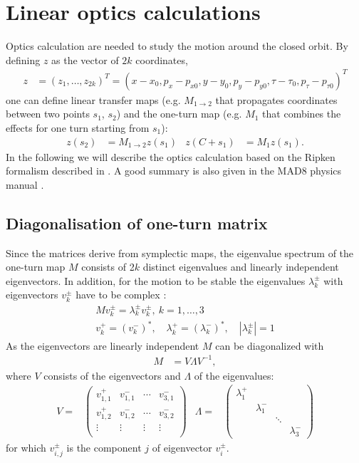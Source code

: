 \chapter{Linear optics calculations}
\label{opt}
Optics calculation are needed to study the motion around the closed orbit. By defining $z$ as the vector of $2 k$ coordinates,  
\begin{align}\label{opt:eqn:1}
z&=(z_1,\ldots,z_{2k})^T=(x-x_0,p_x-p_{x0},y-y_0,p_y-p_{y0},\tau-\tau_0,p_\tau-p_{\tau0})^T
\end{align}
one can define linear transfer maps (e.g. $M_{1\to 2}$ that propagates coordinates between two points $s_1$, $s_2$) and the one-turn map (e.g. $M_1$ that combines the effects for one turn starting from $s_1$):
\begin{align}\label{opt:eqn:2}
z(s_2)&= M_{1\to 2} z(s_1) & z(C+s_1) &= M_1 z(s_1).
\end{align}
In the following we will describe the optics calculation based on the Ripken formalism described in \cite{willeke88}. A good summary is also given in the MAD8 physics manual \cite{mad8phys}.

\section{Diagonalisation of one-turn matrix}
\label{opt:sec:1}
Since the matrices derive from symplectic maps, the eigenvalue spectrum of the one-turn map $M$ consists of 2$k$ distinct eigenvalues and linearly independent eigenvectors. In addition, for the motion to be stable the eigenvalues $\lambda_k^{\pm}$ with eigenvectors $v_k^{\pm}$ have to be complex \cite{willeke88}:
\begin{align}
M v_k^\pm  =  \lambda_k^\pm v_k^\pm, \ k=1,\ldots, 3 \\
v_k^+=(v_k^-)^*, \quad \lambda_k^+=(\lambda_k^-)^*, \quad |\lambda_k^{\pm}|=1
\end{align}
As the eigenvectors are linearly independent $M$ can be diagonalized with
\begin{align}
M &= V \Lambda V^{-1},
\end{align}
where $V$ consists of the eigenvectors and $\Lambda$ of the eigenvalues:
\begin{align}
V=&\left(
\begin{array}{cccc}
v^+_{1,1} & v^-_{1,1} & \cdots & v^-_{3,1}\\
v^+_{1,2} & v^-_{1,2} & \cdots & v^-_{3,2}\\
\vdots    & \vdots    & \vdots & \vdots \\
\end{array}
\right)  &
\Lambda=&\left(
\begin{array}{cccc}
\lambda^+_1 &    & &\\
& \lambda^-_1 & &\\
& & \ddots & \\
& & & \lambda^-_3
\end{array}
\right)
\end{align}
for which $v^{\pm}_{i,j}$ is the component $j$ of eigenvector $v_i^{\pm}$.


